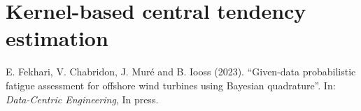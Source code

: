 \cleardoublepage
\chapter{Kernel-based central tendency estimation}
\label{chpt:4}
\hfill
\localtableofcontents
\newpage


\begin{tcolorbox}[colback=gray!5!white, colframe=gray!5!white, coltitle=gray!70!white, coltext=gray!60!white, title=\textbf{This chapter is adapted from the following reference:}]
    E. Fekhari, V. Chabridon, J. Muré and B. Iooss (2023). ``Given-data probabilistic fatigue assessment for offshore wind turbines using Bayesian quadrature''. In: \textit{Data-Centric Engineering}, In press.
\end{tcolorbox}


